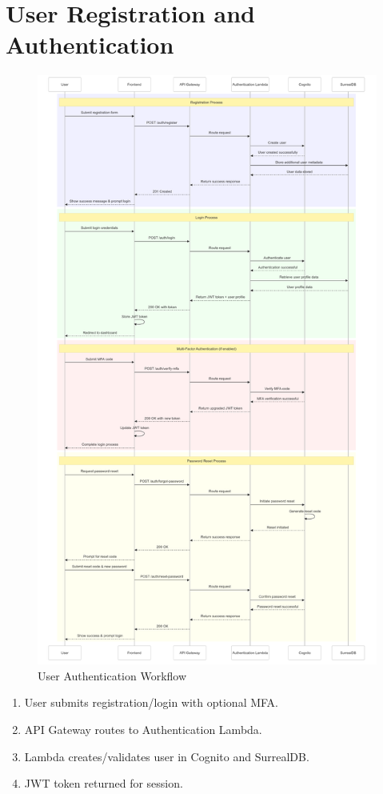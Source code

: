 \documentclass[a4paper, 11pt]{scrreprt}
\begin{document}
\section{User Registration and Authentication}
\begin{figure}[!htb]
    \centering
    \includegraphics[height=0.7\textheight]{user_authentication.png}
    \caption{User Authentication Workflow}
\end{figure}
\begin{enumerate}
    \item User submits registration/login with optional MFA.
    \item API Gateway routes to Authentication Lambda.
    \item Lambda creates/validates user in Cognito and SurrealDB.
    \item JWT token returned for session.
\end{enumerate}
\end{document}
